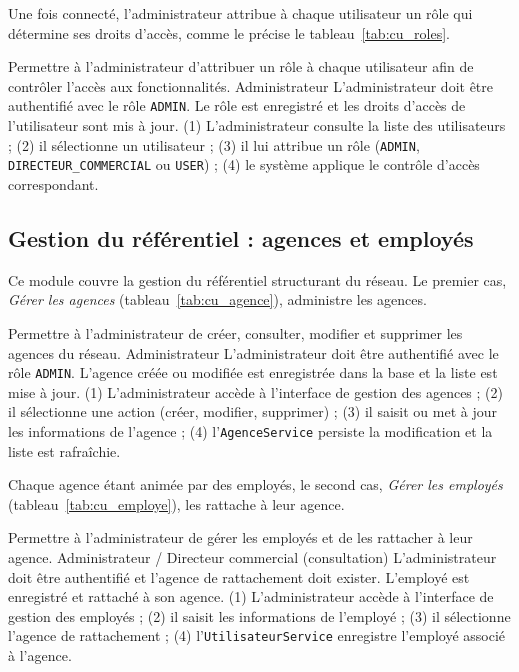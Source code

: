 Une fois connecté, l'administrateur attribue à chaque utilisateur un rôle qui
détermine ses droits d'accès, comme le précise le tableau~\ref{tab:cu_roles}.

{Permettre à l'administrateur d'attribuer un rôle à chaque utilisateur afin de
contrôler l'accès aux fonctionnalités.}
{Administrateur}
{L'administrateur doit être authentifié avec le rôle \texttt{ADMIN}.}
{Le rôle est enregistré et les droits d'accès de l'utilisateur sont mis à jour.}
{(1) L'administrateur consulte la liste des utilisateurs ; (2) il sélectionne un
utilisateur ; (3) il lui attribue un rôle (\texttt{ADMIN},
\texttt{DIRECTEUR\_COMMERCIAL} ou \texttt{USER}) ; (4) le système applique le
contrôle d'accès correspondant.}

\subsection{Gestion du référentiel : agences et employés}
Ce module couvre la gestion du référentiel structurant du réseau. Le premier cas,
\emph{Gérer les agences} (tableau~\ref{tab:cu_agence}), administre les agences.

{Permettre à l'administrateur de créer, consulter, modifier et supprimer les
agences du réseau.}
{Administrateur}
{L'administrateur doit être authentifié avec le rôle \texttt{ADMIN}.}
{L'agence créée ou modifiée est enregistrée dans la base et la liste est mise à
jour.}
{(1) L'administrateur accède à l'interface de gestion des agences ; (2) il
sélectionne une action (créer, modifier, supprimer) ; (3) il saisit ou met à jour
les informations de l'agence ; (4) l'\texttt{AgenceService} persiste la
modification et la liste est rafraîchie.}

Chaque agence étant animée par des employés, le second cas, \emph{Gérer les
employés} (tableau~\ref{tab:cu_employe}), les rattache à leur agence.

{Permettre à l'administrateur de gérer les employés et de les rattacher à leur
agence.}
{Administrateur / Directeur commercial (consultation)}
{L'administrateur doit être authentifié et l'agence de rattachement doit exister.}
{L'employé est enregistré et rattaché à son agence.}
{(1) L'administrateur accède à l'interface de gestion des employés ; (2) il saisit
les informations de l'employé ; (3) il sélectionne l'agence de rattachement ; (4)
l'\texttt{UtilisateurService} enregistre l'employé associé à l'agence.}

